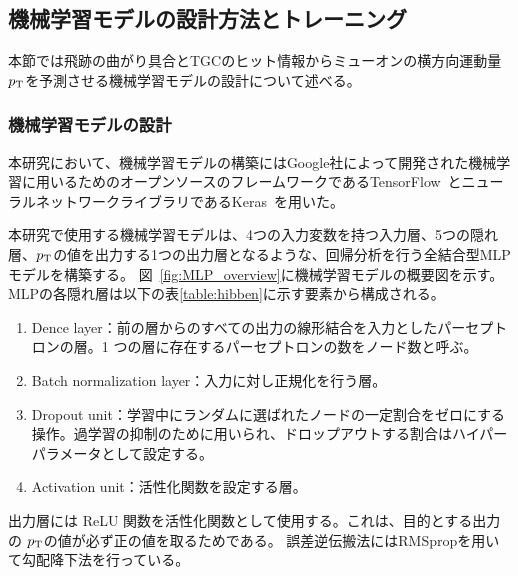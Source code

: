 

\subsection{機械学習モデルの設計方法とトレーニング}
本節では飛跡の曲がり具合とTGCのヒット情報からミューオンの横方向運動量$p_{\rm{T}}$を予測させる機械学習モデルの設計について述べる。

\subsubsection{機械学習モデルの設計}
本研究において、機械学習モデルの構築にはGoogle社によって開発された機械学習に用いるためのオープンソースのフレームワークであるTensorFlow~\cite{article:TensorFlow}とニューラルネットワークライブラリであるKeras~\cite{article:keras}を用いた。

本研究で使用する機械学習モデルは、4つの入力変数を持つ入力層、5つの隠れ層、$p_{\rm{T}}$の値を出力する1つの出力層となるような、回帰分析を行う全結合型MLPモデルを構築する。
図~\ref{fig:MLP_overview}に機械学習モデルの概要図を示す。
MLPの各隠れ層は以下の表\ref{table:hibben}に示す要素から構成される。
\begin{enumerate}\label{table:hibben}
   \item Dence layer：前の層からのすべての出力の線形結合を入力としたパーセプトロンの層。1 つの層に存在するパーセプトロンの数をノード数と呼ぶ。
   \item Batch normalization layer：入力に対し正規化を行う層。
   \item Dropout unit：学習中にランダムに選ばれたノードの一定割合をゼロにする操作。過学習の抑制のために用いられ、ドロップアウトする割合はハイパーパラメータとして設定する。
   \item Activation unit：活性化関数を設定する層。
\end{enumerate}
出力層には ReLU 関数を活性化関数として使用する。これは、目的とする出力の $p_{\rm{T}}$の値が必ず正の値を取るためである。
誤差逆伝搬法にはRMSpropを用いて勾配降下法を行っている。

